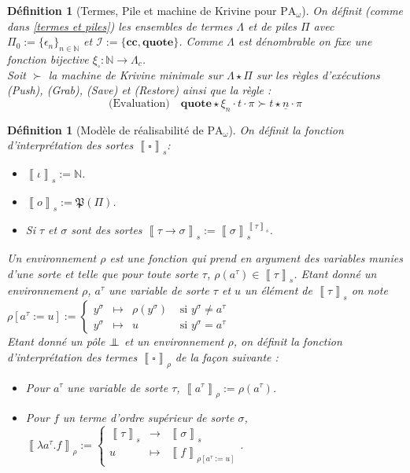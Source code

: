 \documentclass[a4paper,12pt]{article}
\newtheorem{defi}[theo]{Définition}
\theoremstyle{rmqstyle}
\newcommand{\N}{\mathbb{N}}
\newcommand{\set}[1]{\{#1\}}
\newcommand{\itp}[1]{\left\llbracket#1\right\rrbracket}
\newcommand{\fundefdef}[3]{#1:= \left\{\begin{array}{ccc}#2\\#3\end{array}\right.}
\newcommand{\PA}{\mathrm{PA}}
\renewcommand{\P}{\mathfrak{P}}
\newcommand{\cc}{\mathbf{cc}}
\newcommand{\pole}{{\protect\mathpalette{\protect\polehelper}{\bot}}} \def\polehelper#1#2{\mathrel{\rlap{$#1#2$}\mkern3mu{#1#2}}}
\newcommand{\Kri}[1]{\underline{#1}}
\begin{document}
\begin{defi}[Termes, Pile et machine de Krivine pour $\PA_\omega$]
On définit (comme dans \ref{termes et piles}) les ensembles de termes $\Lambda$ et de piles $\Pi$ avec $\Pi_0 := \set{\epsilon_n}_{n \in \N}$ et $\mathcal{I} := \set{\cc, \mathbf{quote}}$. Comme $\Lambda$ est dénombrable on fixe une fonction bijective $\xi_{\square} : \N \to \Lambda_c$.\\
Soit $\succ$ la machine de Krivine minimale sur $\Lambda \star \Pi$ sur les règles d'exécutions \textit{(Push)}, \textit{(Grab)}, \textit{(Save)} et \textit{(Restore)} ainsi que la règle :
$$\text{(Evaluation)} \quad \mathbf{quote} \star \xi_n \cdot t \cdot \pi \succ t \star \Kri{n} \cdot \pi$$
\end{defi}

\begin{defi}[Modèle de réalisabilité de $\PA_\omega$]
On définit la fonction d'interprétation des sortes $\itp{\square}_s$: 
\begin{itemize}
\setlength\itemsep{ -1 em}
\item $\itp{\iota}_s := \N$.\\
\item $\itp{o}_s := \P(\Pi)$.\\
\item Si $\tau$ et $\sigma$ sont des sortes $\itp{\tau \to \sigma}_s := \itp{\sigma}_s^{\itp{\tau}_s}$.
\end{itemize}
Un environnement $\rho$ est une fonction qui prend en argument des variables munies d'une sorte et telle que pour toute sorte $\tau$, $\rho(a^\tau) \in \itp{\tau}_s$. Etant donné un environnement $\rho$, $a^\tau$ une variable de sorte $\tau$ et $u$ un élément de $\itp{\tau}_s$ on note $\rho[a^\tau := u] := 
\left\{\begin{array}{cccc}
y^\sigma& \mapsto& \rho(y^\sigma) &\text{ si } y^\sigma \neq a^\tau\\
y^\sigma& \mapsto& u                      &\text{ si } y^\sigma = a^\tau
\end{array}\right. $\\
Etant donné un pôle $\pole$ et un environnement $\rho$, on définit la fonction d'interprétation des termes $\itp{\square}_\rho$ de la façon suivante :
\begin{itemize}
\setlength\itemsep{ -1 em}
\item Pour $a^\tau$ une variable de sorte $\tau$, $\itp{a^\tau}_\rho := \rho(a^\tau)$.\\
\item Pour $f$ un terme d'ordre supérieur de sorte $\sigma$, $\fundefdef{\itp{\lambda a^\tau. f}_\rho}{\itp{\tau}_s& \to& \itp{\sigma}_s}{u& \mapsto& \itp{f}_{\rho[a^\tau := u]} }$.\\

\end{itemize}
\end{defi}
\end{document}

